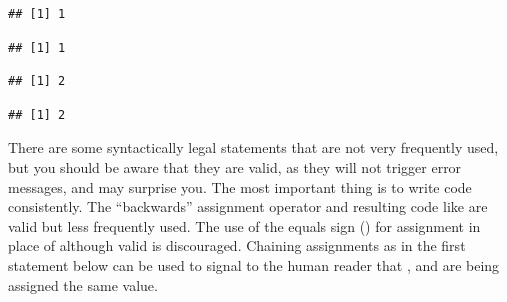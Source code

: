 \documentclass[krantz2]{krantz}\usepackage{knitr}
\begin{document}
\begin{knitrout}\footnotesize
{}\color{fgcolor}\begin{kframe}
\begin{alltt}
\end{alltt}
\begin{verbatim}
## [1] 1
\end{verbatim}
\begin{alltt}
\end{alltt}
\begin{verbatim}
## [1] 1
\end{verbatim}
\begin{alltt}
 \hlopt{+} 
\end{alltt}
\begin{verbatim}
## [1] 2
\end{verbatim}
\begin{alltt}
 \hlopt{+} \hlstd{)}
\end{alltt}
\begin{verbatim}
## [1] 2
\end{verbatim}
\end{kframe}
\end{knitrout}
\begin{playground}
There are some syntactically legal statements that are not very frequently used, but you should be aware that they are valid, as they will not trigger error messages, and may surprise you. The most important thing is to write code consistently. The ``backwards'' assignment operator \Roperator{->} and resulting code like  are valid but less frequently used. The use of the equals sign (\Roperator{=}) for assignment in place of \Roperator{<-} although valid is discouraged. Chaining assignments as in the first statement below can be used to signal to the human reader that ,  and  are being assigned the same value.

\begin{knitrout}\footnotesize
{}\color{fgcolor}\begin{kframe}
\begin{alltt}
 \hlkwb{<-}  \hlkwb{<-}  \hlkwb{<-} 
 \hlkwb{->} 
 \hlkwb{=} 
\end{alltt}
\end{kframe}
\end{knitrout}

\end{playground}
\end{document}
